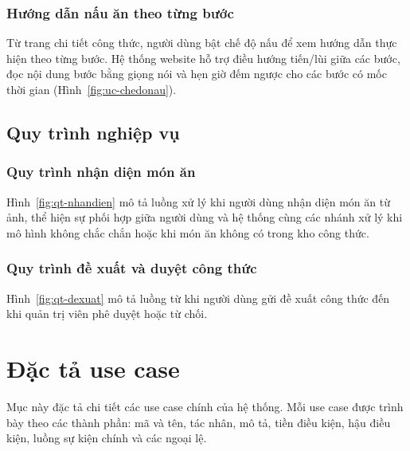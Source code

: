 \documentclass[../DoAn.tex]{subfiles}
\begin{document}

\subsubsection{Hướng dẫn nấu ăn theo từng bước}
Từ trang chi tiết công thức, người dùng bật chế độ nấu để xem hướng dẫn thực hiện theo từng bước. Hệ thống website hỗ trợ điều hướng tiến/lùi giữa các bước, đọc nội dung bước bằng giọng nói và hẹn giờ đếm ngược cho các bước có mốc thời gian (Hình~\ref{fig:uc-chedonau}).


\subsection{Quy trình nghiệp vụ}

\subsubsection{Quy trình nhận diện món ăn}
Hình~\ref{fig:qt-nhandien} mô tả luồng xử lý khi người dùng nhận diện món ăn từ ảnh, thể hiện sự phối hợp giữa người dùng và hệ thống cùng các nhánh xử lý khi mô hình không chắc chắn hoặc khi món ăn không có trong kho công thức.


\subsubsection{Quy trình đề xuất và duyệt công thức}
Hình~\ref{fig:qt-dexuat} mô tả luồng từ khi người dùng gửi đề xuất công thức đến khi quản trị viên phê duyệt hoặc từ chối.


\section{Đặc tả use case}
\label{sec:2-dactahoa}
Mục này đặc tả chi tiết các use case chính của hệ thống. Mỗi use case được trình bày theo các thành phần: mã và tên, tác nhân, mô tả, tiền điều kiện, hậu điều kiện, luồng sự kiện chính và các ngoại lệ.

\newcommand{\uctable}[3]{%
  \par\addvspace{\medskipamount}%
  \begin{minipage}{\linewidth}
  \centering
  \captionof{table}{#1}\label{#2}
  \begin{tabular}{|p{3.1cm}|p{10.4cm}|}\hline #3 \end{tabular}
  \end{minipage}%
  \par\addvspace{\medskipamount}}
\end{document}
